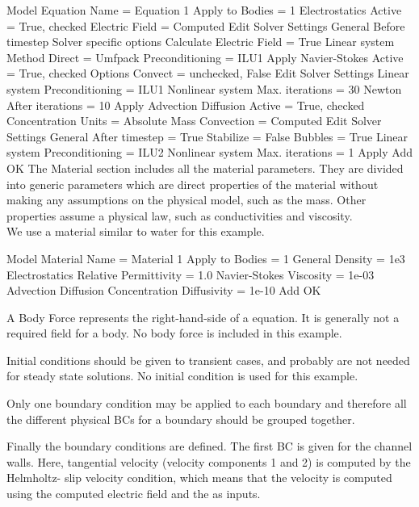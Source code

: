 \ttbegin
Model
  Equation
   Name = Equation 1
    Apply to Bodies = 1
    Electrostatics
      Active = True, checked
      Electric Field = Computed
      Edit Solver Settings
      General
        Before timestep
      Solver specific options
        Calculate Electric Field = True
      Linear system
        Method
          Direct = Umfpack
        Preconditioning = ILU1
     Apply
     Navier-Stokes
       Active = True, checked
       Options
         Convect = unchecked, False
      Edit Solver Settings
       Linear system
         Preconditioning = ILU1
       Nonlinear system
         Max. iterations = 30
         Newton
           After iterations = 10
     Apply
     Advection Diffusion
        Active = True, checked
        Concentration Units = Absolute Mass
        Convection = Computed
      Edit Solver Settings
       General
         After timestep = True
         Stabilize = False
         Bubbles = True
       Linear system
         Preconditioning = ILU2
       Nonlinear system
         Max. iterations = 1
     Apply
    Add
    OK
\ttend        
The Material section includes all the material parameters. They are divided into generic parameters which are direct properties of the material without making any assumptions on the physical model, such as the mass. Other properties assume a physical law, such as conductivities and viscosity. \\

We use a material similar to water for this example.

\ttbegin
Model
  Material
    Name = Material 1
    Apply to Bodies = 1 
      General
        Density = 1e3
      Electrostatics
        Relative Permittivity = 1.0
      Navier-Stokes
        Viscosity = 1e-03
      Advection Diffusion
        Concentration Diffusivity = 1e-10
    Add
    OK
\ttend

A Body Force represents the right-hand-side of a equation. It is generally not a required field for a body.   No body force is included in this example.

Initial conditions should be given to transient cases, and probably are not needed for steady state solutions. No initial condition is used for this example.

Only one boundary condition may be applied to each boundary and therefore all the different physical BCs for a boundary should be grouped together. 

Finally the boundary conditions are defined. The first BC is given for the channel walls. Here, tangential velocity (velocity components 1 and 2) is computed by the Helmholtz- slip velocity condition, which means that the velocity is computed using the computed electric field and the  as inputs. 

